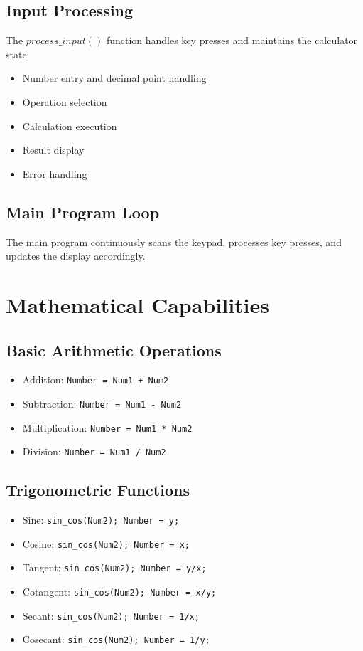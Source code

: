 \documentclass[12pt]{article}
\begin{document}
\subsection{Input Processing}
The $process\_input()$ function handles key presses and maintains the calculator state:
\begin{itemize}
\item Number entry and decimal point handling
\item Operation selection
\item Calculation execution
\item Result display
\item Error handling
\end{itemize}
\subsection{Main Program Loop}
The main program continuously scans the keypad, processes key presses, and updates the display accordingly.
\section{Mathematical Capabilities}
\subsection{Basic Arithmetic Operations}
\begin{itemize}
\item Addition: \texttt{Number = Num1 + Num2}
\item Subtraction: \texttt{Number = Num1 - Num2}
\item Multiplication: \texttt{Number = Num1 * Num2}
\item Division: \texttt{Number = Num1 / Num2}
\end{itemize}
\subsection{Trigonometric Functions}
\begin{itemize}
\item Sine: \texttt{sin\_cos(Num2); Number = y;}
\item Cosine: \texttt{sin\_cos(Num2); Number = x;}
\item Tangent: \texttt{sin\_cos(Num2); Number = y/x;}
\item Cotangent: \texttt{sin\_cos(Num2); Number = x/y;}
\item Secant: \texttt{sin\_cos(Num2); Number = 1/x;}
\item Cosecant: \texttt{sin\_cos(Num2); Number = 1/y;}
\end{itemize}
\end{document}
